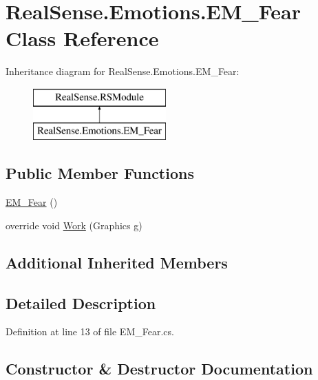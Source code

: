 \hypertarget{class_real_sense_1_1_emotions_1_1_e_m___fear}{}\section{Real\+Sense.\+Emotions.\+E\+M\+\_\+\+Fear Class Reference}
\label{class_real_sense_1_1_emotions_1_1_e_m___fear}
Inheritance diagram for Real\+Sense.\+Emotions.\+E\+M\+\_\+\+Fear\+:\begin{figure}[H]
\begin{center}
\leavevmode
\includegraphics[height=2.000000cm]{class_real_sense_1_1_emotions_1_1_e_m___fear}
\end{center}
\end{figure}
\subsection*{Public Member Functions}
\begin{DoxyCompactItemize}
\item 
\hyperlink{class_real_sense_1_1_emotions_1_1_e_m___fear_af5fb3d9f1043968e5b673c5cfc478f97}{E\+M\+\_\+\+Fear} ()
\item 
override void \hyperlink{class_real_sense_1_1_emotions_1_1_e_m___fear_a5b417a4a8403f101585dc8c239288c54}{Work} (Graphics g)
\end{DoxyCompactItemize}
\subsection*{Additional Inherited Members}


\subsection{Detailed Description}


Definition at line 13 of file E\+M\+\_\+\+Fear.\+cs.



\subsection{Constructor \& Destructor Documentation}
\mbox{\label{class_real_sense_1_1_emotions_1_1_e_m___fear_af5fb3d9f1043968e5b673c5cfc478f97}} 
